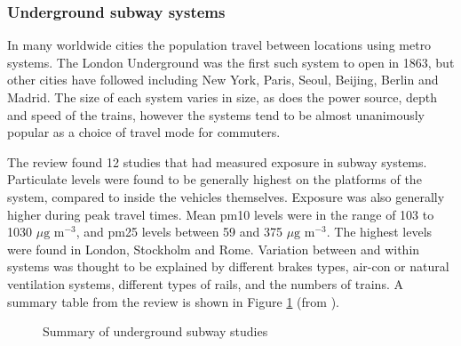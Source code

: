 
\subsubsection{Underground subway systems}
\label{sec:underground}


In many worldwide cities the population travel between locations using metro systems. The London Underground was the first such system to open in 1863, but other cities have followed including New York, Paris, Seoul, Beijing, Berlin and Madrid. The size of each system varies in size, as does the power source, depth and speed of the trains, however the systems tend to be almost unanimously popular as a choice of travel mode for commuters.

The \cite{Karanasiou2014} review found 12 studies that had measured exposure in subway systems. Particulate levels were found to be generally highest on the platforms of the system, compared to inside the vehicles themselves. Exposure was also generally higher during peak travel times. Mean \gls{pm10} levels were in the range of 103 to 1030 $\mu \text{g m}^{-3}$, and \gls{pm25} levels between 59 and 375 $\mu \text{g m}^{-3}$. The highest levels were found in London, Stockholm and Rome. Variation between and within systems was thought to be explained by different brakes types, air-con or natural ventilation systems, different types of rails, and the numbers of trains. A summary table from the review is shown in Figure \ref{fig:pm_tube_summary} (from  \cite{Karanasiou2014}).

\begin{landscape}
\begin{figure}[H]
\centering
{}
\caption{Summary of underground subway studies}
\label{fig:pm_tube_summary}
\end{figure}
\end{landscape}

